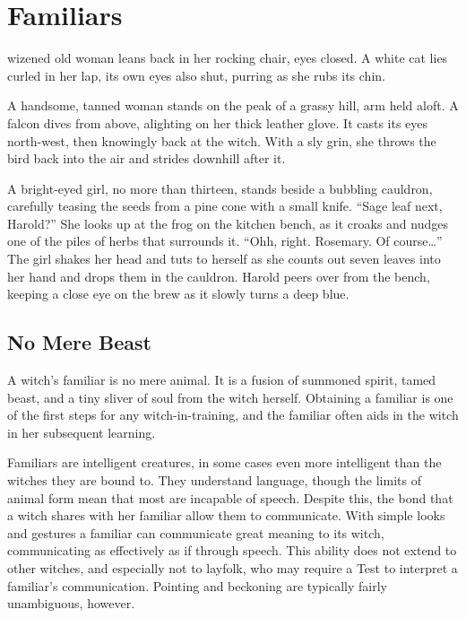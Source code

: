 \chapter{Familiars}

 wizened old woman leans back in her rocking chair, eyes closed.
A white cat lies curled in her lap, its own eyes also shut, purring as she rubs its chin.

A handsome, tanned woman stands on the peak of a grassy hill, arm held aloft.
A falcon dives from above, alighting on her thick leather glove.
It casts its eyes north-west, then knowingly back at the witch.
With a sly grin, she throws the bird back into the air and strides downhill after it.

A bright-eyed girl, no more than thirteen, stands beside a bubbling cauldron, carefully teasing the seeds from a pine cone with a small knife.
``Sage leaf next, Harold?''
She looks up at the frog on the kitchen bench, as it croaks and nudges one of the piles of herbs that surrounds it.
``Ohh, right. Rosemary. Of course{\dots}''
The girl shakes her head and tuts to herself as she counts out seven leaves into her hand and drops them in the cauldron.
Harold peers over from the bench, keeping a close eye on the brew as it slowly turns a deep blue.

\section{No Mere Beast}

A witch's familiar is no mere animal.
It is a fusion of summoned spirit, tamed beast, and a tiny sliver of soul from the witch herself.
Obtaining a familiar is one of the first steps for any witch-in-training, and the familiar often aids in the witch in her subsequent learning.

Familiars are intelligent creatures, in some cases even more intelligent than the witches they are bound to.
They understand language, though the limits of animal form mean that most are incapable of speech.
Despite this, the bond that a witch shares with her familiar allow them to communicate.
With simple looks and gestures a familiar can communicate great meaning to its witch, communicating as effectively as if through speech.
This ability does not extend to other witches, and especially not to layfolk, who may require a Test to interpret a familiar's communication.
Pointing and beckoning are typically fairly unambiguous, however.

